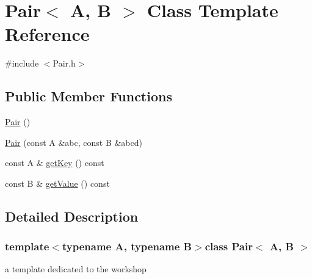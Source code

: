 \hypertarget{classPair}{\section{Pair$<$ A, B $>$ Class Template Reference}
\label{classPair}
}


{\ttfamily \#include $<$Pair.\-h$>$}

\subsection*{Public Member Functions}
\begin{DoxyCompactItemize}
\item 
\hyperlink{classPair_abd2f69806ab7f320b0d1e0232556d3ab}{Pair} ()
\item 
\hyperlink{classPair_aa26b7a4d230bcbabaa13b56a8f93c8a9}{Pair} (const A \&abc, const B \&abcd)
\item 
const A \& \hyperlink{classPair_a1487233e2d7d6386fbd454024f00a045}{get\-Key} () const 
\item 
const B \& \hyperlink{classPair_a6282d63a792880c4e545a438ed8bc91d}{get\-Value} () const 
\end{DoxyCompactItemize}


\subsection{Detailed Description}
\subsubsection*{template$<$typename A, typename B$>$class Pair$<$ A, B $>$}

a template dedicated to the workshop 

